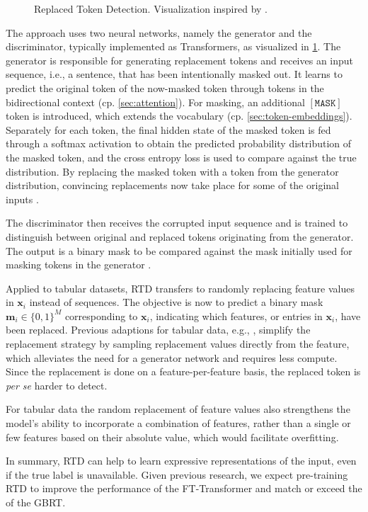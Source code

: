 \begin{figure}[ht]
    \centering
    {\renewcommand\normalsize{\small}
        \normalsize
        }
    \caption[Replaced Token Detection]{Replaced Token Detection. Visualization inspired by \textcite[\checkmark][3]{clarkElectraPretrainingText2020}.}
    \label{fig:random-token-replacement}
\end{figure}


The approach uses two neural networks, namely the generator and the discriminator, typically implemented as Transformers, as visualized in \cref{fig:random-token-replacement}.  The generator is responsible for generating replacement tokens and receives an input sequence, i.e., a sentence, that has been intentionally masked out. It learns to predict the original token of the now-masked token through tokens in the bidirectional context (cp. \cref{sec:attention}). For masking, an additional $\mathtt{[MASK]}$ token is introduced, which extends the vocabulary (cp. \cref{sec:token-embeddings}). Separately for each token, the final hidden state of the masked token is fed through a softmax activation to obtain the predicted probability distribution of the masked token, and the cross entropy loss is used to compare against the true distribution. By replacing the masked token with a token from the generator distribution, convincing replacements now take place for some of the original inputs \autocite[\checkmark][2--3]{clarkElectraPretrainingText2020}.

The discriminator then receives the corrupted input sequence and is trained to distinguish between original and replaced tokens originating from the generator. The output is a binary mask to be compared against the mask initially used for masking tokens in the generator \autocite[\checkmark][2--3]{clarkElectraPretrainingText2020}.

Applied to tabular datasets, \gls{RTD} transfers to randomly replacing feature values in $\mathbf{x}_{i}$ instead of sequences. The objective is now to predict a binary mask $\mathbf{m}_{i}\in \{0,1\}^{M}$ corresponding to $\mathbf{x}_{i}$, indicating which features, or entries in $\mathbf{x}_{i}$, have been replaced. Previous adaptions for tabular data, e.g., \textcite[\checkmark][3]{huangTabTransformerTabularData2020}, simplify the replacement strategy by sampling replacement values directly from the feature, which alleviates the need for a generator network and requires less compute. Since the replacement is done on a feature-per-feature basis, the replaced token is \emph{per se} harder to detect.

For tabular data the random replacement of feature values also strengthens the model's ability to incorporate a combination of features, rather than a single or few features based on their absolute value, which would facilitate overfitting.

In summary, \gls{RTD} can help to learn expressive representations of the input, even if the true label is unavailable. Given previous research, we expect pre-training \gls{RTD} to improve the performance of the FT-Transformer and match or exceed the of the \gls{GBRT}.
